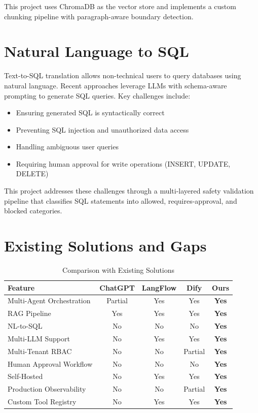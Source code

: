 \documentclass[12pt, a4paper]{report}
\begin{document}
This project uses ChromaDB as the vector store and implements a custom chunking pipeline with paragraph-aware boundary detection.

\section{Natural Language to SQL}

Text-to-SQL translation allows non-technical users to query databases using natural language. Recent approaches leverage LLMs with schema-aware prompting to generate SQL queries. Key challenges include:
\begin{itemize}
    \item Ensuring generated SQL is syntactically correct
    \item Preventing SQL injection and unauthorized data access
    \item Handling ambiguous user queries
    \item Requiring human approval for write operations (INSERT, UPDATE, DELETE)
\end{itemize}

This project addresses these challenges through a multi-layered safety validation pipeline that classifies SQL statements into allowed, requires-approval, and blocked categories.

\section{Existing Solutions and Gaps}

\begin{table}[H]
\centering
\caption{Comparison with Existing Solutions}
\label{tab:comparison}
\small
\begin{tabular}{p{4.2cm}|c|c|c|c}
\toprule
\textbf{Feature} & \textbf{ChatGPT} & \textbf{LangFlow} & \textbf{Dify} & \textbf{Ours} \\
\midrule
Multi-Agent Orchestration & Partial & Yes & Yes & \textbf{Yes} \\
RAG Pipeline              & Yes     & Yes & Yes & \textbf{Yes} \\
NL-to-SQL                 & No      & No  & No  & \textbf{Yes} \\
Multi-LLM Support         & No      & Yes & Yes & \textbf{Yes} \\
Multi-Tenant RBAC         & No      & No  & Partial & \textbf{Yes} \\
Human Approval Workflow   & No      & No  & No  & \textbf{Yes} \\
Self-Hosted               & No      & Yes & Yes & \textbf{Yes} \\
Production Observability   & No      & No  & Partial & \textbf{Yes} \\
Custom Tool Registry      & No      & Yes & Yes & \textbf{Yes} \\
\bottomrule
\end{tabular}
\end{table}
\end{document}
